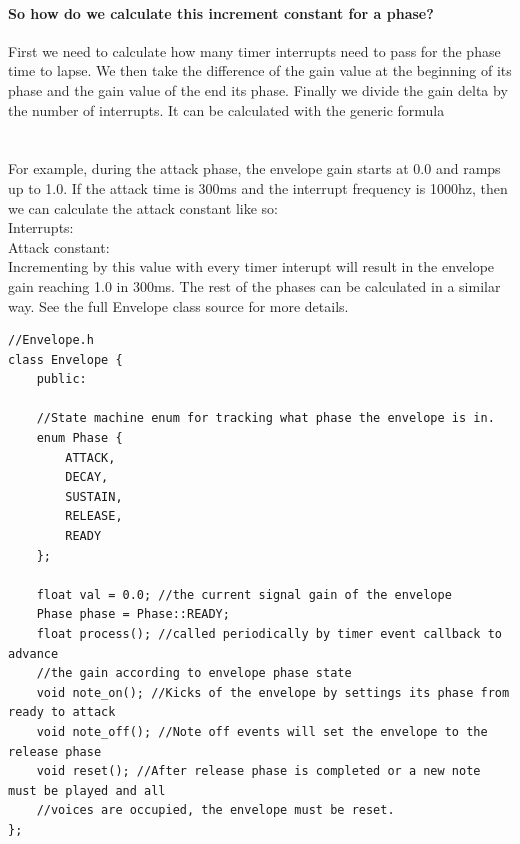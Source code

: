 \documentclass[acmlarge,screen]{acmart}
\begin{document}
	\paragraph{So how do we calculate this increment constant for a phase?} First we need to calculate how many timer interrupts need to pass for the phase time to lapse. We then take the difference of the gain value at the beginning of its phase and the gain value of the end its phase. Finally we divide the gain delta by the number of interrupts. It can be calculated with the generic formula \\
		
	 \\[4pt]
	
	 \\[4pt]
	
	For example, during the attack phase, the envelope gain starts at 0.0 and ramps up to 1.0. If the attack time is 300ms and the interrupt frequency is 1000hz, then we can calculate the attack constant like so:\\
	
	Interrupts:  \\[4pt]
	
	Attack constant:  \\[4pt]
	
	Incrementing by this value with every timer interupt will result in the envelope gain reaching 1.0 in 300ms. The rest of the phases can be calculated in a similar way. See the full Envelope class source for more details.
	
	\begin{verbatim}
//Envelope.h
class Envelope {
	public:
	
	//State machine enum for tracking what phase the envelope is in.
	enum Phase {
		ATTACK,
		DECAY,
		SUSTAIN,
		RELEASE,
		READY 
	};
	
	float val = 0.0; //the current signal gain of the envelope
	Phase phase = Phase::READY;
	float process(); //called periodically by timer event callback to advance
	//the gain according to envelope phase state
	void note_on(); //Kicks of the envelope by settings its phase from ready to attack
	void note_off(); //Note off events will set the envelope to the release phase
	void reset(); //After release phase is completed or a new note must be played and all
	//voices are occupied, the envelope must be reset.
};
	\end{verbatim}
	
\end{document}
